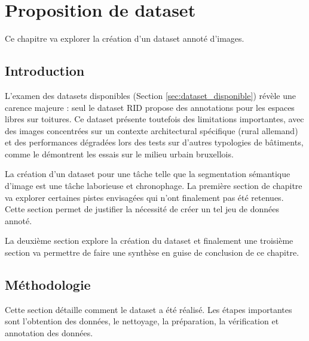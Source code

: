 \chapter{Proposition de dataset}
\label{chap:proposition_modele}

Ce chapitre va explorer la création d'un dataset annoté d'images.

\localtableofcontents

\newpage

\section{Introduction}
L'examen des datasets disponibles (Section \ref{sec:dataset_disponible}) révèle une carence majeure : seul le dataset RID propose des annotations pour les espaces libres sur toitures. Ce dataset présente toutefois des limitations importantes, avec des images concentrées sur un contexte architectural spécifique (rural allemand) et des performances dégradées lors des tests sur d'autres typologies de bâtiments, comme le démontrent les essais sur le milieu urbain bruxellois.

La création d'un dataset pour une tâche telle que la segmentation sémantique d'image est une tâche laborieuse et chronophage. La première section de chapitre va explorer certaines pistes envisagées qui n'ont finalement pas été retenues. Cette section permet de justifier la nécessité de créer un tel jeu de données annoté.

La deuxième section explore la création du dataset et finalement une troisième section va permettre de faire une synthèse en guise de conclusion de ce chapitre.

\section{Méthodologie}
Cette section détaille comment le dataset a été réalisé. Les étapes importantes sont l'obtention des données, le nettoyage, la préparation, la vérification et annotation des données.
